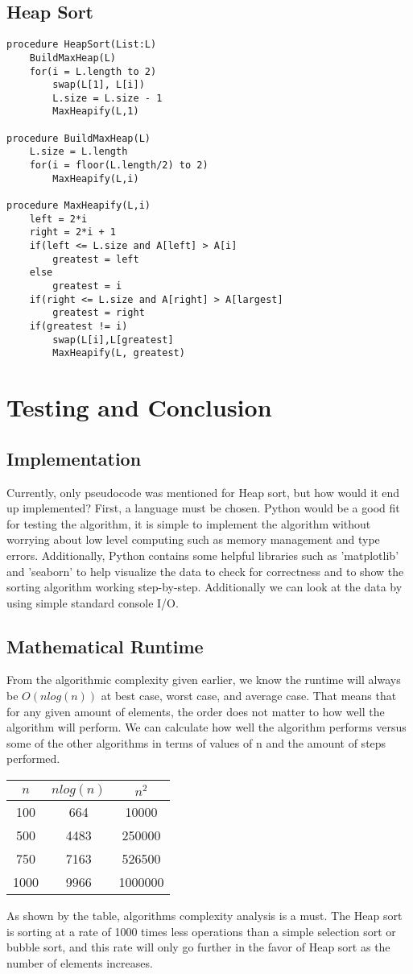 \documentclass{article}
\begin{document}
\subsection{Heap Sort}
\begin{lstlisting}
procedure HeapSort(List:L)
	BuildMaxHeap(L)
	for(i = L.length to 2)
		swap(L[1], L[i])
		L.size = L.size - 1
		MaxHeapify(L,1)

procedure BuildMaxHeap(L)
	L.size = L.length
	for(i = floor(L.length/2) to 2)
		MaxHeapify(L,i)

procedure MaxHeapify(L,i)
	left = 2*i
	right = 2*i + 1
	if(left <= L.size and A[left] > A[i]
		greatest = left
	else
		greatest = i
	if(right <= L.size and A[right] > A[largest]
		greatest = right
	if(greatest != i)
		swap(L[i],L[greatest]
		MaxHeapify(L, greatest)
\end{lstlisting}
\newpage
\section{Testing and Conclusion}
\subsection{Implementation}
Currently, only pseudocode was mentioned for Heap sort, but how would it end up implemented? First, a language must be chosen.
Python would be a good fit for testing the algorithm, it is simple to implement the algorithm without worrying about low level
computing such as memory management and type errors. Additionally, Python contains some helpful libraries such as 'matplotlib'
and 'seaborn' to help visualize the data to check for correctness and to show the sorting algorithm working step-by-step. Additionally
we can look at the data by using simple standard console I/O.
\subsection{Mathematical Runtime}
From the algorithmic complexity given earlier, we know the runtime will always be $O(nlog(n))$ at best case, worst case, and average case. That means that for any given amount of elements, the order does not matter to how well the algorithm will perform. We can calculate how well the algorithm performs versus some of the other algorithms in terms of values of n and the amount of steps performed.

\begin{center}
\begin{tabular}{||c | c c||} 
	\hline
	$n$ & $nlog(n)$ & $n^2$ \\ [0.5ex] 
	\hline\hline
	100 & 664 & 10000\\ 
	\hline
	500 & 4483 & 250000 \\
	\hline
	750 & 7163 & 526500 \\
	\hline
	1000 & 9966 & 1000000\\ [1ex] 
	\hline
\end{tabular}
\end{center}

As shown by the table, algorithms complexity analysis is a must. The Heap sort is sorting at a rate of 1000 times less operations than a simple selection sort or bubble sort, and this rate will only go further in the favor of Heap sort as the number of elements increases. 
\end{document}
